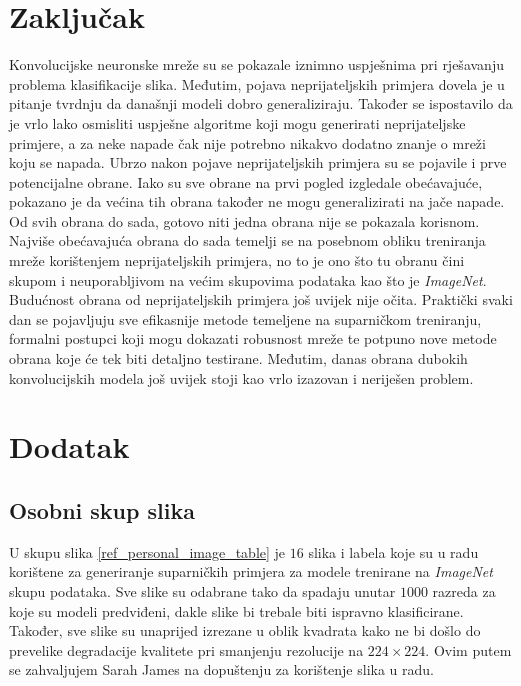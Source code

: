\documentclass[utf8, diplomski]{fer}
\begin{document}
\chapter{Zaključak}
Konvolucijske neuronske mreže su se pokazale iznimno uspješnima pri rješavanju problema klasifikacije slika. Međutim, pojava neprijateljskih primjera dovela je u pitanje tvrdnju da današnji modeli dobro generaliziraju. Također se ispostavilo da je vrlo lako osmisliti uspješne algoritme koji mogu generirati neprijateljske primjere, a za neke napade čak nije potrebno nikakvo dodatno znanje o mreži koju se napada. Ubrzo nakon pojave neprijateljskih primjera su se pojavile i prve potencijalne obrane. Iako su sve obrane na prvi pogled izgledale obećavajuće, pokazano je da većina tih obrana također ne mogu generalizirati na jače napade. Od svih obrana do sada, gotovo niti jedna obrana nije se pokazala korisnom. Najviše obećavajuća obrana do sada temelji se na posebnom obliku treniranja mreže korištenjem neprijateljskih primjera, no to je ono što tu obranu čini skupom i neuporabljivom na većim skupovima podataka kao što je \textit{ImageNet}. Budućnost obrana od neprijateljskih primjera još uvijek nije očita. Praktički svaki dan se pojavljuju sve efikasnije metode temeljene na suparničkom treniranju, formalni postupci koji mogu dokazati robusnost mreže te potpuno nove metode obrana koje će tek biti detaljno testirane. Međutim, danas obrana dubokih konvolucijskih modela još uvijek stoji kao vrlo izazovan i neriješen problem.





\chapter{Dodatak}\label{dodatak}
\section{Osobni skup slika}\label{osobni_skup}
U skupu slika \ref{ref_personal_image_table} je $16$ slika i labela koje su u radu korištene za generiranje suparničkih primjera za modele trenirane na \textit{ImageNet} skupu podataka. Sve slike su odabrane tako da spadaju unutar $1000$ razreda za koje su modeli predviđeni, dakle slike bi trebale biti ispravno klasificirane. Također, sve slike su unaprijed izrezane u oblik kvadrata kako ne bi došlo do prevelike degradacije kvalitete pri smanjenju rezolucije na $224\times224$. Ovim putem se zahvaljujem Sarah James na dopuštenju za korištenje slika u radu.
\end{document}
